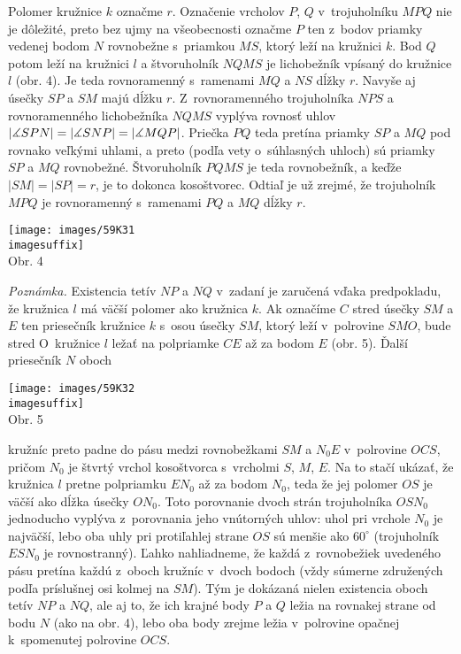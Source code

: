 \rieh Polomer kružnice $k$ označme $r$. Označenie vrcholov $P$, $Q$ v~trojuholníku $MPQ$ nie je dôležité, preto bez ujmy na všeobecnosti označme $P$ ten z~bodov priamky vedenej bodom $N$ rovnobežne s~priamkou $MS$, ktorý leží na kružnici $k$. Bod $Q$ potom leží na kružnici $l$ a štvoruholník $NQMS$ je lichobežník vpísaný do kružnice $l$ (obr. 4). Je teda rovnoramenný s~ramenami $MQ$ a $NS$ dĺžky $r$. Navyše aj úsečky $SP$ a $SM$ majú dĺžku $r$. Z~rovnoramenného trojuholníka $NPS$ a rovnoramenného lichobežníka $NQMS$ vyplýva rovnosť uhlov $|\measuredangle SPN| = |\measuredangle SNP| = |\measuredangle MQP|$. Priečka $PQ$ teda pretína priamky $SP$ a $MQ$ pod rovnako veľkými uhlami, a preto (podľa vety o~súhlasných uhloch) sú priamky $SP$ a $MQ$ rovnobežné. Štvoruholník $PQMS$ je teda rovnobežník, a keďže $|SM| = |SP| = r$, je to dokonca kosoštvorec. Odtiaľ je už zrejmé, že trojuholník $MPQ$ je rovnoramenný s~ramenami $PQ$ a $MQ$ dĺžky $r$.
\begin{center}
\texttt{[image: images/59K31\\imagesuffix]}\\

Obr. 4
\end{center}
\textit{Poznámka.} Existencia tetív $NP$ a $NQ$ v~zadaní je zaručená vďaka predpokladu, že kružnica $l$ má väčší polomer ako kružnica $k$. Ak označíme $C$ stred úsečky $SM$ a $E$ ten priesečník kružnice $k$ s~osou úsečky $SM$, ktorý leží v~polrovine $SMO$, bude stred O~kružnice $l$ ležať na polpriamke $CE$ až za bodom $E$ (obr. 5). Ďalší priesečník $N$ oboch
\begin{center}
\texttt{[image: images/59K32\\imagesuffix]}\\

Obr. 5
\end{center}
kružníc preto padne do pásu medzi rovnobežkami $SM$ a $N_0 E$ v~polrovine $OCS$, pričom $N_0$ je štvrtý vrchol kosoštvorca s~vrcholmi $S$, $M$, $E$. Na to stačí ukázať, že kružnica $l$ pretne polpriamku $EN_0$ až za bodom $N_0$, teda že jej polomer $OS$ je väčší ako dĺžka úsečky $ON_0$. Toto porovnanie dvoch strán trojuholníka $OSN_0$ jednoducho vyplýva z~porovnania jeho vnútorných uhlov: uhol pri vrchole $N_0$ je najväčší, lebo oba uhly pri protiľahlej strane $OS$ sú menšie ako $60^\circ$ (trojuholník $ESN_0$ je rovnostranný). Ľahko nahliadneme, že každá z~rovnobežiek uvedeného pásu pretína každú z~oboch kružníc v~dvoch bodoch (vždy súmerne združených podľa príslušnej osi kolmej na $SM$). Tým je dokázaná nielen existencia oboch tetív $NP$ a $NQ$, ale aj to, že ich krajné body $P$ a $Q$ ležia na rovnakej strane od bodu $N$ (ako na obr. 4), lebo oba body zrejme ležia v~polrovine opačnej k~spomenutej polrovine $OCS$.\\
